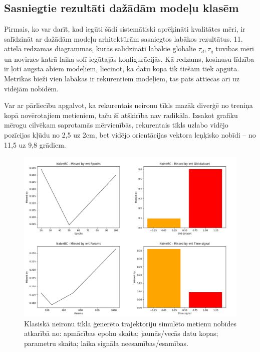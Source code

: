 \documentclass[12pt, a4paper]{article}
\numberwithin{equation}{section} %
\begin{document}
\subsection{Sasniegtie rezultāti dažādām modeļu klasēm}


Pirmais, ko var darīt, kad iegūti šādi sistemātiski aprēķināti kvalitātes mēri, ir salīdzināt ar dažādām modeļu arhitektūrām sasniegtos labākos rezultātus. 11. attēlā redzamas diagrammas, kurās salīdzināti labākie globālie $\tau_d, \tau_g$ tuvības mēri un novirzes katrā laika solī iegūtajās konfigurācijās. Kā redzams, kosinusu līdzība ir ļoti augsta abiem modeļiem, liecinot, ka datu kopa tik tiešām tiek apgūta. Metrikas bieži vien labākas ir rekurentiem modeļiem, tas pats attiecas arī uz vidējām nobīdēm. 

Var ar pārliecību apgalvot, ka rekurentais neironu tīkls mazāk diverģē no treniņa kopā novērotajiem metieniem, taču šī atšķirība nav radikāla. Izsakot grafiku mērogu cilvēkam saprotamās mērvienībās, rekurentais tīkls uzlabo vidējo pozīcijas kļūdu no 2,5 uz 2cm, bet vidējo orientācijas vektora leņķisko nobīdi -- no 11,5 uz 9,8 grādiem.

\begin{figure}[t!]
    \centering
    \includegraphics[width=16cm,page=1]{../img/naivebc_missed.png}
    \caption{Klasiskā neironu tīkla ģenerēto trajektoriju simulēto metienu nobīdes atkarībā no: apmācības epohu skaita; jaunās/vecās datu kopas; parametru skaita; laika signāla neesamības/esamības.}
\end{figure}
\end{document}

